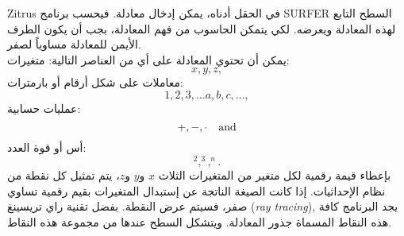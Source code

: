 \begin{surferPage}{Zitrus}
في الحقل أدناه، يمكن إدخال معادلة. فيحسب برنامج \textenglish{SURFER} السطح التابع لهذه المعادلة ويعرضه. لكي يتمكن الحاسوب من فهم المعادلة، بجب أن يكون الطرف الأيمن للمعادلة مساوياً لصفر.
\\
يمكن أن تحتوي المعادلة على أي من العناصر التالية:
\newline
متغيرات:
\[x, y, z, \]
معاملات على شكل أرقام أو بارمترات:
\[1, 2, 3, \dots a, b, c, \dots, \]
عمليات حسابية:
\[+,  - , \cdot \quad \textnormal{and} \]
أس أو قوة العدد:
\[ ^2, ^3, ^n .\]
بإعطاء قيمة رقمية لكل متغير من المتغيرات الثلاث $x$ و$y$ و$z$، يتم تمثيل كل نقطة من نظام الإحداثيات. إذا كانت الصيغة الناتجة عن إستبدال المتغيرات بقيم رقمية تساوي صفر، فسيتم عرض النقطة. بفضل تقنية راي تريسينغ
\textenglish{(\textit{ray tracing})},
يجد البرنامج كافة هذه النقاط المسماة جذور المعادلة. ويتشكل السطح عندها من مجموعة هذه النقاط.
\end{surferPage}
